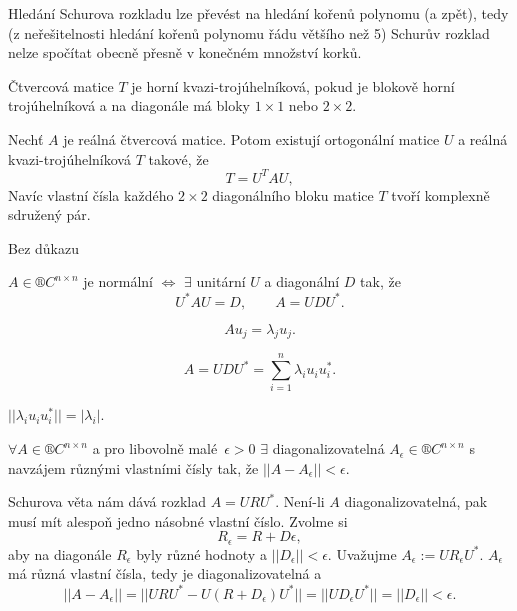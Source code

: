 \documentclass[12pt]{article}					%
\begin{document}
\begin{poznamka}
	Hledání Schurova rozkladu lze převést na hledání kořenů polynomu (a zpět), tedy (z neřešitelnosti hledání kořenů polynomu řádu většího než 5) Schurův rozklad nelze spočítat obecně přesně v konečném množství korků.
\end{poznamka}

\begin{definice}
	Čtvercová matice $T$ je horní kvazi-trojúhelníková, pokud je blokově horní trojúhelníková a na diagonále má bloky $1 \times 1$ nebo $2 \times 2$.
\end{definice}

\begin{veta}
	Nechť $A$ je reálná čtvercová matice. Potom existují ortogonální matice $U$ a reálná kvazi-trojúhelníková $T$ takové, že
	$$ T = U^TAU, $$
	Navíc vlastní čísla každého $2 \times 2$ diagonálního bloku matice $T$ tvoří komplexně sdružený pár.

	\begin{dukazin}
		Bez důkazu
	\end{dukazin}
\end{veta}

\begin{dusledek}
	$A \in ®C^{n \times n}$ je normální $\Leftrightarrow$ $\exists$ unitární $U$ a diagonální $D$ tak, že
	$$ U^*AU = D, \qquad A = UDU^*. $$
\end{dusledek}

\begin{dusledek}[Důsledku]
	$$ Au_j = \lambda_ju_j. $$
\end{dusledek}

\begin{dusledek}
	$$ A = UDU^* = \sum_{i=1}^n \lambda_i u_i u_i^*. $$

	\begin{poznamkain}
		$||\lambda_i u_i u_i^*|| = |\lambda_i|$.
	\end{poznamkain}
\end{dusledek}

\begin{veta}
	$\forall A \in ®C^{n \times n}$ a pro libovolně malé $\epsilon > 0$ $\exists$ diagonalizovatelná $A_{\epsilon} \in ®C^{n \times n}$ s navzájem různými vlastními čísly tak, že $||A - A_\epsilon|| < \epsilon$.

	\begin{dukazin}
		Schurova věta nám dává rozklad $A = URU^*$. Není-li $A$ diagonalizovatelná, pak musí mít alespoň jedno násobné vlastní číslo. Zvolme si
		$$ R_\epsilon = R + D \epsilon, $$
		aby na diagonále $R_\epsilon$ byly různé hodnoty a $||D_\epsilon|| < \epsilon$. Uvažujme $A_\epsilon := UR_\epsilon U^*$. $A_\epsilon$ má různá vlastní čísla, tedy je diagonalizovatelná a
		$$ ||A - A_\epsilon|| = ||URU^* - U(R + D_\epsilon)U^*|| = ||UD_\epsilon U^*|| = ||D_\epsilon|| < \epsilon. $$
	\end{dukazin}
\end{veta}
\end{document}
